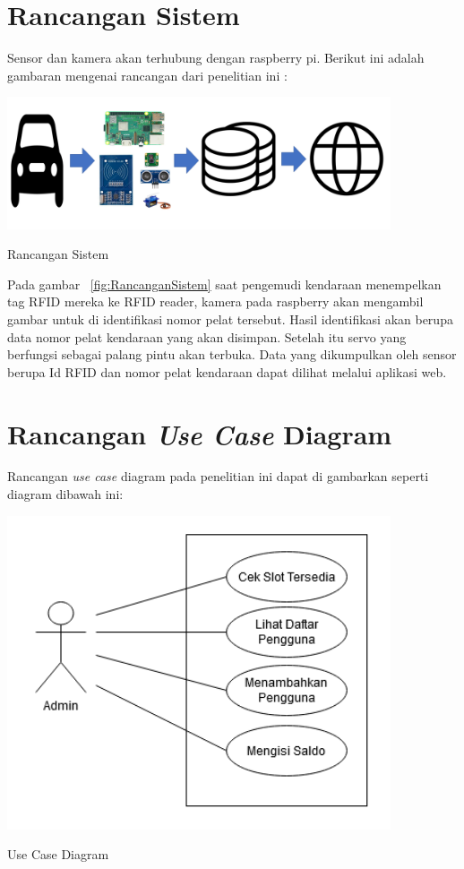 \section{Rancangan Sistem}
Sensor dan kamera akan terhubung dengan raspberry pi. Berikut ini adalah gambaran mengenai rancangan dari penelitian ini :\newline

\begin{afigure} 
    \includegraphics[width=0.85\textwidth, center]{images/rancangan sistem.png}
    \caption{Rancangan Sistem}
    \label{fig:RancanganSistem}
\end{afigure}

Pada gambar ~\ref{fig:RancanganSistem} saat pengemudi kendaraan menempelkan tag RFID mereka ke RFID reader, kamera pada raspberry akan mengambil gambar untuk di identifikasi nomor pelat tersebut. Hasil identifikasi akan berupa data nomor pelat kendaraan yang akan disimpan. Setelah itu servo yang berfungsi sebagai palang pintu akan terbuka. Data yang dikumpulkan oleh sensor berupa Id RFID dan nomor pelat kendaraan dapat dilihat melalui aplikasi web.

\section{Rancangan \textit{Use Case} Diagram}
Rancangan \textit{use case} diagram pada penelitian ini dapat di gambarkan seperti diagram dibawah ini:

\begin{afigure} 
    \includegraphics[width=0.85\textwidth, center]{images/Use Case Diagram.png}
    \caption{Use Case Diagram}
    \label{fig:usecasediagram}
\end{afigure}

